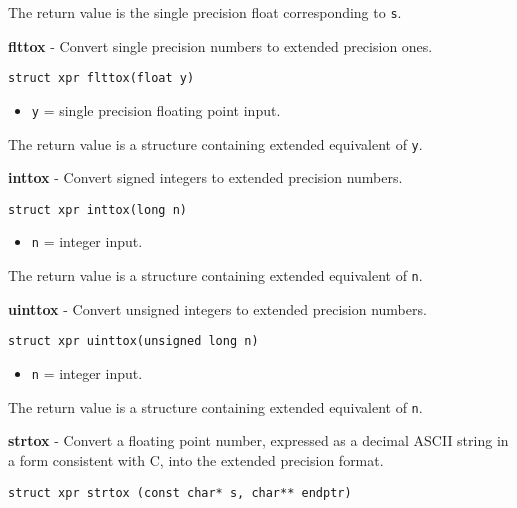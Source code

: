 \documentclass{article}
\begin{document}
The return value is the single precision float corresponding
to \texttt{s}.


\hrulefill{}

\textbf{flttox} - Convert single precision numbers to extended precision ones.

\begin{verbatim}
struct xpr flttox(float y)
\end{verbatim}

\begin{itemize}
\item \texttt{y} = single precision floating point input.
\end{itemize}

The return value is a structure containing extended equivalent
of \texttt{y}.


\hrulefill{}

\textbf{inttox} - Convert signed integers to extended precision numbers.

\begin{verbatim}
struct xpr inttox(long n)
\end{verbatim}

\begin{itemize}
\item \texttt{n} = integer input.
\end{itemize}

The return value is a structure containing extended equivalent
of \texttt{n}.


\hrulefill{}

\textbf{uinttox} - Convert unsigned integers to extended precision numbers.

\begin{verbatim}
struct xpr uinttox(unsigned long n)
\end{verbatim}

\begin{itemize}
\item \texttt{n} = integer input.
\end{itemize}

The return value is a structure containing extended equivalent
of \texttt{n}.


\hrulefill{}

\textbf{strtox} - Convert a floating point number, 
expressed as a decimal ASCII string
in a form consistent with C, into the extended precision format.

\begin{verbatim}
struct xpr strtox (const char* s, char** endptr)
\end{verbatim}
\end{document}
